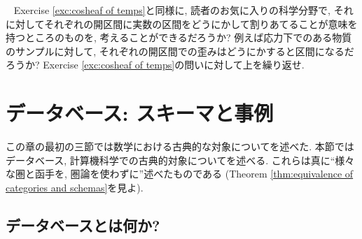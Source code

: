 \begin{exercise}~
\sexc Exercise \ref{exc:cosheaf of temps}と同様に, 読者のお気に入りの科学分野で, それに対してそれぞれの開区間に実数の区間をどうにかして割りあてることが意味を持つところのものを, 考えることができるだろうか? 例えば応力下でのある物質のサンプルに対して, それぞれの開区間での歪みはどうにかすると区間になるだろうか? 
\next Exercise \ref{exc:cosheaf of temps}の問いに対して上を繰り返せ.
\endsexc
\end{exercise}



\section{データベース: スキーマと事例}\label{sec:databases}


この章の最初の三節では数学における古典的な対象についてを述べた. 本節ではデータベース, 計算機科学での古典的対象についてを述べる. これらは真に``様々な圏と函手を, 圏論を使わずに''述べたものである (Theorem \ref{thm:equivalence of categories and schemas}を見よ).


\subsection{データベースとは何か?}\label{sec:what are dbs}

